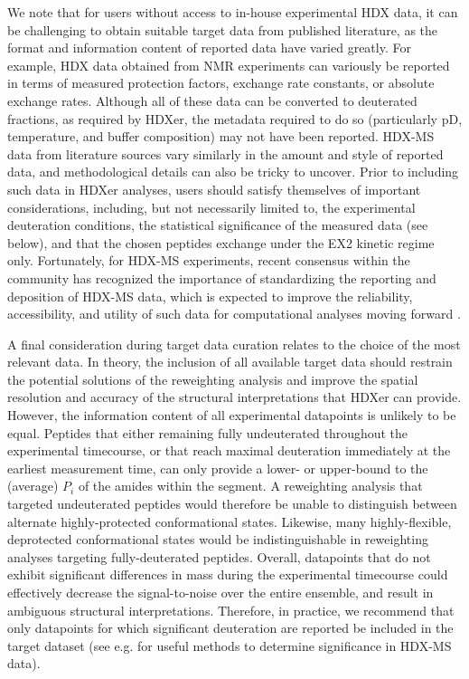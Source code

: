 \documentclass[9pt,tutorial]{livecoms}
\begin{document}
We note that for users without access to in-house experimental HDX data, it can be challenging to obtain suitable target data from published literature, as the format and information content of reported data have varied greatly.
For example, HDX data obtained from NMR experiments can variously be reported in terms of measured protection factors, exchange rate constants, or absolute exchange rates.
Although all of these data can be converted to deuterated fractions, as required by HDXer, the metadata required to do so (particularly pD, temperature, and buffer composition) may not have been reported.
HDX-MS data from literature sources vary similarly in the amount and style of reported data, and methodological details can also be tricky to uncover.
Prior to including such data in HDXer analyses, users should satisfy themselves of important considerations, including, but not necessarily limited to, the experimental deuteration conditions, the statistical significance of the measured data (see below), and that the chosen peptides exchange under the EX2 kinetic regime only.
Fortunately, for HDX-MS experiments, recent consensus within the community has recognized the importance of standardizing the reporting and deposition of HDX-MS data, which is expected to improve the reliability, accessibility, and utility of such data for computational analyses moving forward \cite{Masson2019}.

A final consideration during target data curation relates to the choice of the most relevant data. 
In theory, the inclusion of all available target data should restrain the potential solutions of the reweighting analysis and improve the spatial resolution and accuracy of the structural interpretations that HDXer can provide.
However, the information content of all experimental datapoints is unlikely to be equal.
Peptides that either remaining fully undeuterated throughout the experimental timecourse, or that reach maximal deuteration immediately at the earliest measurement time, can only provide a lower- or upper-bound to the (average) $P_i$ of the amides within the segment.
A reweighting analysis that targeted undeuterated peptides would therefore be unable to distinguish between alternate highly-protected conformational states.
Likewise, many highly-flexible, deprotected conformational states would be indistinguishable in reweighting analyses targeting fully-deuterated peptides.
Overall, datapoints that do not exhibit significant differences in mass during the experimental timecourse could effectively decrease the signal-to-noise over the entire ensemble, and result in ambiguous structural interpretations.
Therefore, in practice, we recommend that only datapoints for which significant deuteration are reported be included in the target dataset (see e.g. \cite{Hageman2019, Weis2021} for useful methods to determine significance in HDX-MS data).
\end{document}
